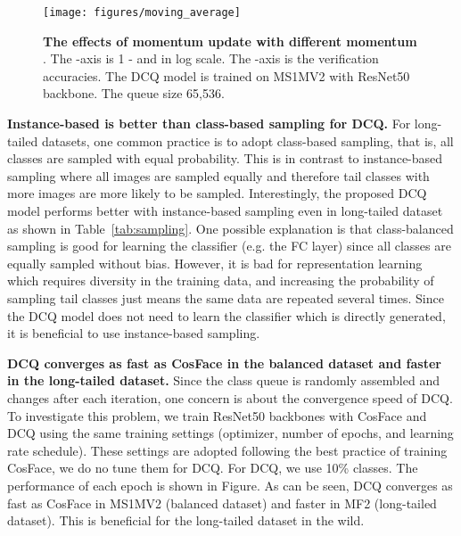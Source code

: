 \documentclass[10pt,twocolumn,letterpaper]{article}
\begin{document}
\begin{figure}[t]
   \centering
   \footnotesize
   \texttt{[image: figures/moving\_average]}
   \caption{\textbf{The effects of momentum update with different momentum }. The -axis is 1 -  and in log scale. The -axis is the verification accuracies. The DCQ model is trained on MS1MV2 with ResNet50 backbone. The queue size 65,536. \label{fig:moving_average}}
\end{figure}

\textbf{Instance-based is better than class-based sampling for DCQ.} For long-tailed datasets, one common practice is to adopt class-based sampling, that is, all classes are sampled with equal probability. This is in contrast to instance-based sampling where all images are sampled equally and therefore tail classes with more images are more likely to be sampled. Interestingly, the proposed DCQ model performs better with instance-based sampling even in long-tailed dataset as shown in Table~\ref{tab:sampling}. One possible explanation is that class-balanced sampling is good for learning the classifier (e.g. the FC layer) since all classes are equally sampled without bias. However, it is bad for representation learning which requires diversity in the training data, and increasing the probability of sampling tail classes just means the same data are repeated several times. Since the DCQ model does not need to learn the classifier which is directly generated, it is beneficial to use instance-based sampling.

\begin{table}[h]
   \centering
   \footnotesize
   \caption{\textbf{Comparisons between instance- and class- sampling}, \label{tab:sampling}}
\end{table}

\textbf{DCQ converges as fast as CosFace in the balanced dataset and faster in the long-tailed dataset.} Since the class queue is randomly assembled and changes after each iteration, one concern is about the convergence speed of DCQ. To investigate this problem, we train ResNet50 backbones with CosFace and DCQ using the same training settings (optimizer, number of epochs, and learning rate schedule). These settings are adopted following the best practice of training CosFace, we do no tune them for DCQ. For DCQ, we use 10\% classes.
The performance of each epoch is shown in Figure. As can be seen, DCQ converges as fast as CosFace in MS1MV2 (balanced dataset) and faster in MF2 (long-tailed dataset). This is beneficial for the long-tailed dataset in the wild.
\end{document}
